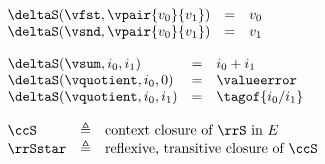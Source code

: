 \begin{flushleft}
\medskip
{}\\
$\begin{array}{l c l}
  \deltaS(\vfst, \vpair{v_0}{v_1}) & = & v_0
\\
  \deltaS(\vsnd, \vpair{v_0}{v_1}) & = & v_1
\end{array}$

\medskip
{}
$\begin{array}{l c l}
  \deltaS(\vsum, i_0, i_1) & = & i_0 + i_1
\\
  \deltaS(\vquotient, i_0, 0) & = & \valueerror
\\
  \deltaS(\vquotient, i_0, i_1) & = & \tagof{i_0 / i_1}
\end{array}$

\medskip
{}
\begin{mathpar}


\end{mathpar}

\medskip
$\begin{array}{l c l}
  \ccS & \triangleq & \mbox{context closure of $\rrS$ in $E$}
\\
  \rrSstar & \triangleq & \mbox{reflexive, transitive closure of $\ccS$}
\end{array}$


\end{flushleft}
